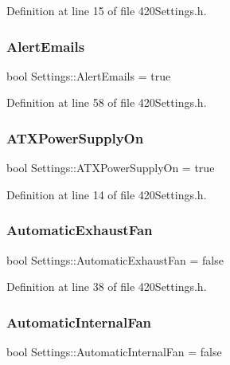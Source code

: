 Definition at line 15 of file 420\+Settings.\+h.

\mbox{\label{struct_settings_ab5da35043f9751f24f9bce845e6396f9}} 
\subsubsection{\texorpdfstring{AlertEmails}{AlertEmails}}
{\footnotesize\ttfamily bool Settings\+::\+Alert\+Emails = true}



Definition at line 58 of file 420\+Settings.\+h.

\mbox{\label{struct_settings_aa0f09634ac2ed8005a3cc0df485f9f0f}} 
\subsubsection{\texorpdfstring{ATXPowerSupplyOn}{ATXPowerSupplyOn}}
{\footnotesize\ttfamily bool Settings\+::\+A\+T\+X\+Power\+Supply\+On = true}



Definition at line 14 of file 420\+Settings.\+h.

\mbox{\label{struct_settings_a9cdd75a68c50eec617e6602e78f123e4}} 
\subsubsection{\texorpdfstring{AutomaticExhaustFan}{AutomaticExhaustFan}}
{\footnotesize\ttfamily bool Settings\+::\+Automatic\+Exhaust\+Fan = false}



Definition at line 38 of file 420\+Settings.\+h.

\mbox{\label{struct_settings_ac773bfdbe0c39013b77f3df24c10c0ec}} 
\subsubsection{\texorpdfstring{AutomaticInternalFan}{AutomaticInternalFan}}
{\footnotesize\ttfamily bool Settings\+::\+Automatic\+Internal\+Fan = false}



